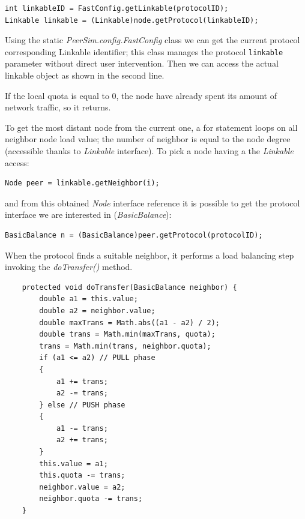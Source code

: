 \documentclass[a4paper,11pt]{article}
\begin{document}
\begin{verbatim}
int linkableID = FastConfig.getLinkable(protocolID);
Linkable linkable = (Linkable)node.getProtocol(linkableID);
\end{verbatim}


Using the static \emph{PeerSim.config.FastConfig} class we can get the
current protocol corresponding Linkable identifier; this class manages
the protocol \texttt{linkable} parameter without direct user
intervention. Then we can access the actual linkable object as shown
in the second line.

If the local quota is equal to 0, the node have already
spent its amount of network traffic, so it returns.

To get the most distant node from the current one, a for statement loops on
all neighbor node load value; the number of neighbor is equal to the
node degree (accessible thanks to \emph{Linkable} interface). To pick
a node having a the \emph{Linkable} access:

\begin{verbatim}
Node peer = linkable.getNeighbor(i);
\end{verbatim}

and from this obtained \emph{Node} interface reference it is possible
to get the protocol interface we are interested in (\emph{BasicBalance}):

\begin{verbatim}
BasicBalance n = (BasicBalance)peer.getProtocol(protocolID);
\end{verbatim}

When the protocol finds a suitable neighbor, it performs a load balancing
step invoking the \emph{doTransfer()} method.

\footnotesize
\begin{verbatim}
    protected void doTransfer(BasicBalance neighbor) {
        double a1 = this.value;
        double a2 = neighbor.value;
        double maxTrans = Math.abs((a1 - a2) / 2);
        double trans = Math.min(maxTrans, quota);
        trans = Math.min(trans, neighbor.quota);
        if (a1 <= a2) // PULL phase
        {
            a1 += trans;
            a2 -= trans;
        } else // PUSH phase
        {
            a1 -= trans;
            a2 += trans;
        }
        this.value = a1;
        this.quota -= trans;
        neighbor.value = a2;
        neighbor.quota -= trans;
    }
\end{verbatim}
\normalsize
\end{document}
